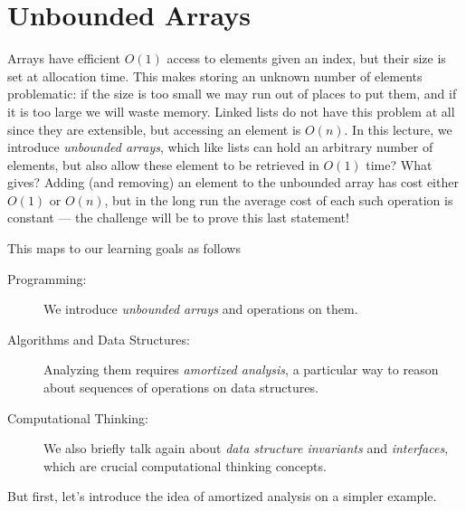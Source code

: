 \chapter{Unbounded Arrays}
\label{ch:ubarrays}

\newcommand{\lecnum}{11}
\newcommand{\lecturer}{Rob Simmons, Frank Pfenning}

\maketitle

\begin{preamble}
\noindent
Arrays have efficient $O(1)$ access to elements given an index, but
their size is set at allocation time.  This makes storing an unknown
number of elements problematic: if the size is too small we may run
out of places to put them, and if it is too large we will waste
memory.  Linked lists do not have this problem at all since they are
extensible, but accessing an element is $O(n)$.  In this lecture, we
introduce \emph{unbounded arrays}, which like lists can hold an
arbitrary number of elements, but also allow these element to be
retrieved in $O(1)$ time?  What gives?  Adding (and removing) an
element to the unbounded array has cost either $O(1)$ or $O(n)$, but
in the long run the average cost of each such operation is constant
--- the challenge will be to prove this last statement!
\end{preamble}

\begin{gram}
This maps to our learning goals as follows
\begin{description}
\item[Programming: ]%
  We introduce \emph{unbounded arrays} and operations on them.
\item[Algorithms and Data Structures: ]%
  Analyzing them requires \emph{amortized analysis}, a particular way to
  reason about sequences of operations on data structures.
\item[Computational Thinking: ]%
  We also briefly talk again about \emph{data structure invariants} and
  \emph{interfaces}, which are crucial computational thinking concepts.
\end{description}
But first, let's introduce the idea of amortized analysis on a simpler
example.
\end{gram}


